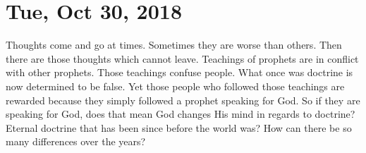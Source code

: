 \section{Tue, Oct 30, 2018}

Thoughts come and go at times. Sometimes they are worse than others. Then there are
those thoughts which cannot leave. Teachings of prophets are in conflict with other
prophets. Those teachings confuse people. What once was doctrine is now determined to
be false. Yet those people who followed those teachings are rewarded because they
simply followed a prophet speaking for God. So if they are speaking for God, does
that mean God changes His mind in regards to doctrine? Eternal doctrine that has been
since before the world was? How can there be so many differences over the years?
